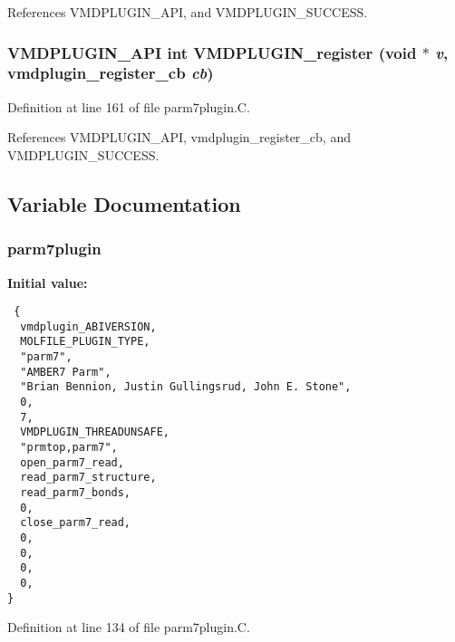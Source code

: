 References VMDPLUGIN\_\-API, and VMDPLUGIN\_\-SUCCESS.
\subsubsection{\setlength{\rightskip}{0pt plus 5cm}VMDPLUGIN\_\-API int VMDPLUGIN\_\-register (void $\ast$ {\em v}, {\bf vmdplugin\_\-register\_\-cb} {\em cb})}\label{parm7plugin_8C_a7}




Definition at line 161 of file parm7plugin.C.

References VMDPLUGIN\_\-API, vmdplugin\_\-register\_\-cb, and VMDPLUGIN\_\-SUCCESS.

\subsection{Variable Documentation}
\subsubsection{ parm7plugin\hspace{0.3cm}{\tt  [static]}}\label{parm7plugin_8C_a0}


{\bf Initial value:}

\footnotesize\begin{verbatim} {
  vmdplugin_ABIVERSION,          
  MOLFILE_PLUGIN_TYPE,           
  "parm7",                       
  "AMBER7 Parm",                 
  "Brian Bennion, Justin Gullingsrud, John E. Stone", 
  0,                             
  7,                             
  VMDPLUGIN_THREADUNSAFE,        
  "prmtop,parm7",                
  open_parm7_read,        
  read_parm7_structure,  
  read_parm7_bonds,
  0,                             
  close_parm7_read,     
  0,
  0,
  0,
  0,
}\end{verbatim}\normalsize 


Definition at line 134 of file parm7plugin.C.